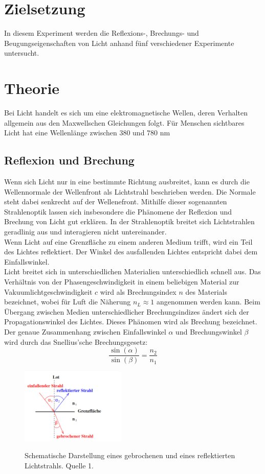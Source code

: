 \section{Zielsetzung}
In diesem Experiment werden die Reflexions-, Brechungs- und Beugungseigenschaften von Licht anhand fünf verschiedener Experimente untersucht.
\section{Theorie}
Bei Licht handelt es sich um eine elektromagnetische Wellen, deren Verhalten allgemein aus den Maxwellschen Gleichungen folgt. Für Menschen sichtbares Licht hat eine Wellenlänge zwischen $380$ und $780$ nm
\subsection{Reflexion und Brechung}
Wenn sich Licht nur in eine bestimmte Richtung ausbreitet, kann es durch die Wellennormale der Wellenfront als Lichtstrahl beschrieben werden. Die Normale steht dabei senkrecht auf der Wellenefront. Mithilfe dieser sogenannten Strahlenoptik lassen sich insbesondere die Phänomene der Reflexion und Brechung von Licht gut erklären. In der Strahlenoptik breitet sich Lichtstrahlen geradlinig aus und interagieren nicht untereinander. \\
Wenn Licht auf eine Grenzfläche zu einem anderen Medium trifft, wird ein Teil des Lichtes reflektiert. Der Winkel des ausfallenden Lichtes entspricht dabei dem Einfallswinkel. \\
Licht breitet sich in unterschiedlichen Materialien unterschiedlich schnell aus. Das Verhältnis von der Phasengeschwindigkeit in einem beliebigen Material zur Vakuumlichtgeschwindigkeit $c$ wird als Brechungsindex $n$ des Materials bezeichnet, wobei für Luft die Näherung $n_L \approx 1$ angenommen werden kann. Beim Übergang zwischen Medien unterschiedlicher Brechungsindizes ändert sich der Propagationswinkel des Lichtes. Dieses Phänomen wird als Brechung bezeichnet. Der genaue Zusammenhang zwischen Einfallswinkel $\alpha$ und Brechungswinkel $\beta$ wird durch das Snellius'sche Brechungsgesetz:
\begin{equation}
\frac{\sin(\alpha)}{\sin(\beta)}=\frac{n_2}{n_1}
\end{equation}
\begin{figure} [h]
    \centering
    \includegraphics[width=5cm, keepaspectratio]{Reflexion und Brechung}
    \label{fig:Reflexion und Brechung}
    \caption{Schematische Darstellung eines gebrochenen und eines reflektierten Lichtstrahls. Quelle 1.}
 \end{figure}
